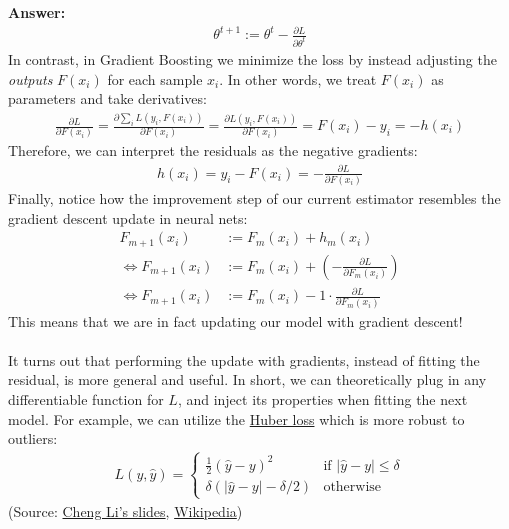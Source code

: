 \documentclass{article}
\newenvironment{QandA}{\begin{enumerate}[label=\arabic*.]}{\end{enumerate}}
\newenvironment{InnerQandA}{\begin{enumerate}[label=\roman*.]}{\end{enumerate}}
\newenvironment{answer}{\par\normalfont \textbf{Answer:}}{}
\begin{document}
\begin{QandA}
\begin{InnerQandA}
\begin{answer}
            \begin{align*}
                \theta^{t+1} := \theta^t - \frac{\partial L}{\partial \theta^t}
            \end{align*}
            In contrast, in Gradient Boosting we minimize the loss by instead adjusting the \textit{outputs} $F(x_i)$ for each sample $x_i$. In other words, we treat $F(x_i)$ as parameters and take derivatives:
            \begin{align*}
                \frac{\partial L}{\partial F(x_i)} = \frac{\partial \sum_i L(y_i, F(x_i))}{\partial F(x_i)} = \frac{\partial L(y_i, F(x_i))}{\partial F(x_i)} = F(x_i) - y_i = - h(x_i)
            \end{align*}
            Therefore, we can interpret the residuals as the negative gradients:
            \begin{align*}
                h(x_i) = y_i - F(x_i) = - \frac{\partial L}{\partial F(x_i)}
            \end{align*}
            Finally, notice how the improvement step of our current estimator resembles the gradient descent update in neural nets:
            \begin{align*}
                F_{m+1}(x_i) &:= F_m(x_i) + h_m(x_i) \\
                \Leftrightarrow F_{m+1}(x_i) &:= F_m(x_i) + (-\frac{\partial L}{\partial F_m(x_i)}) \\
                \Leftrightarrow F_{m+1}(x_i) &:= F_m(x_i) 
                - 1 \cdot \frac{\partial L}{\partial F_m(x_i)}
            \end{align*}
            This means that we are in fact updating our model with gradient descent! \\\\
            It turns out that performing the update with gradients, instead of fitting the residual, is more general and useful. In short, we can theoretically plug in any differentiable function for $L$, and inject its properties when fitting the next model. For example, we can utilize the \href{https://en.wikipedia.org/wiki/Huber_loss}{Huber loss} which is more robust to outliers:
            \begin{align*}
                L(y, \hat{y}) = \begin{cases}
                    \frac{1}{2}(\hat{y} - y)^2 &\text{if } \vert \hat{y} - y \vert \le \delta \\
                    \delta(\vert \hat{y} - y \vert - \delta/2) &\text{otherwise}
                \end{cases}
            \end{align*}
            (Source: \href{http://www.chengli.io/tutorials/gradient_boosting.pdf}{Cheng Li's slides}, \href{https://en.wikipedia.org/wiki/Gradient_boosting}{Wikipedia})
            

\end{answer}
\end{InnerQandA}
\end{QandA}
\end{document}
